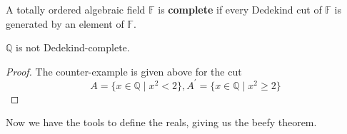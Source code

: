   \begin{definition}
    A totally ordered algebraic field $\mathbb{F}$ is \textbf{complete} if every Dedekind cut of $\mathbb{F}$ is generated by an element of $\mathbb{F}$. 
  \end{definition} 

  \begin{theorem}
    $\mathbb{Q}$ is not Dedekind-complete. 
  \end{theorem}
  \begin{proof}
    The counter-example is given above for the cut 
    \begin{equation}
      A = \{x \in \mathbb{Q} \mid x^2 < 2 \}, A^\prime = \{x \in \mathbb{Q} \mid x^2 \geq 2 \}
    \end{equation}
  \end{proof} 

  Now we have the tools to define the reals, giving us the beefy theorem. 

